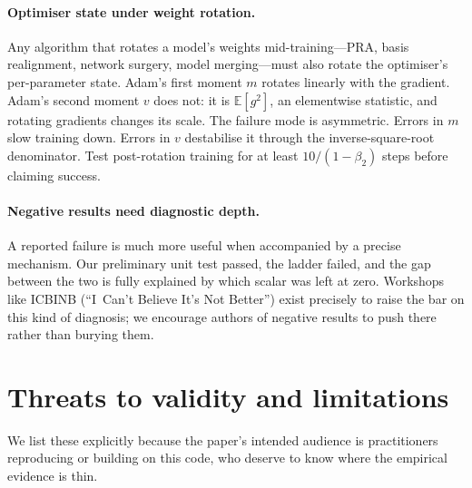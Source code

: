 \documentclass[11pt]{article}
\newcommand{\pra}{\textsc{PRA}}
\begin{document}
\paragraph{Optimiser state under weight rotation.}
Any algorithm that rotates a model's weights mid-training---\pra{},
basis realignment, network surgery, model merging---must also rotate
the optimiser's per-parameter state. Adam's first moment $m$ rotates
linearly with the gradient. Adam's second moment $v$ does not: it is
$\mathbb{E}[g^2]$, an elementwise statistic, and rotating gradients
changes its scale. The failure mode is asymmetric. Errors in $m$ slow
training down. Errors in $v$ destabilise it through the
inverse-square-root denominator. Test post-rotation training for at
least $10/(1{-}\beta_2)$ steps before claiming success.

\paragraph{Negative results need diagnostic depth.}
A reported failure is much more useful when accompanied by a precise
mechanism. Our preliminary unit test passed, the ladder failed, and the
gap between the two is fully explained by which scalar was left at
zero. Workshops like ICBINB (``I~Can't Believe It's Not Better'') exist
precisely to raise the bar on this kind of diagnosis; we encourage
authors of negative results to push there rather than burying them.

\section{Threats to validity and limitations}
\label{sec:limits}

We list these explicitly because the paper's intended audience is
practitioners reproducing or building on this code, who deserve to know
where the empirical evidence is thin.
\end{document}

